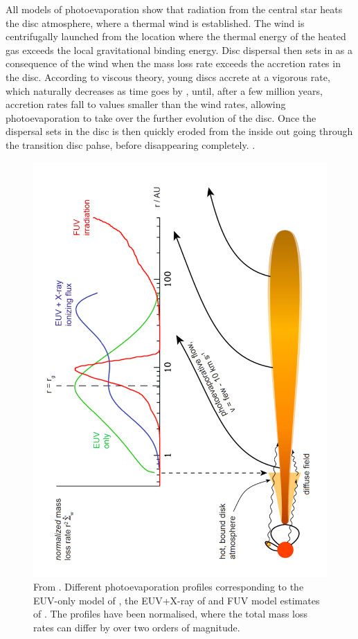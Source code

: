 \documentclass[10pt,fleqn,twoside]{article}
\begin{document}
All models of photoevaporation show that radiation from the central
star heats the disc atmosphere, where a thermal  wind is established.
The wind is centrifugally launched from the location where the thermal
energy of the heated gas exceeds the local gravitational binding
energy. 
Disc dispersal then sets in as a consequence of the wind when the mass
loss rate exceeds the accretion rates in the disc. According to
viscous theory, young discs accrete
at a vigorous rate, which naturally decreases as time goes by
\citep[e.g.,][]{2008apsf.book.....H},
until,
after a few million years, accretion rates fall to values smaller than
the wind rates, allowing photoevaporation to take over the further
evolution of the disc. Once the dispersal sets in the disc is then
quickly eroded from the inside out going through the transition disc
pahse, before disappearing completely.
\citep[see e.g.,][for recent reviews of this process]{2014prpl.conf..475A,
2011ARA&A..49..195A}.


\begin{figure}
  \includegraphics[width=0.75\linewidth, angle = 270]{profiles.pdf}
  \caption{From \citet{2011ARA&A..49..195A}. Different photoevaporation profiles
    corresponding to the EUV-only model of \citet{2006MNRAS.369..216A, 2006MNRAS.369..229A},
    the EUV+X-ray of \citet{2010MNRAS.401.1415O} and FUV model estimates of
    \citet{2009ApJ...705.1237G}. The profiles have been
    normalised, where the total mass loss rates can differ by over two
    orders of magnitude. }
  \label{fig:profiles}
\end{figure}
\end{document}
